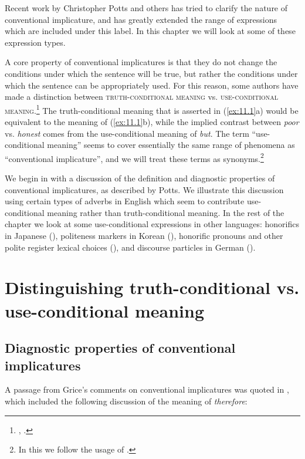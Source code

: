 Recent work by Christopher Potts and others has tried to clarify the nature of conventional implicature, and has greatly extended the range of expressions which are included under this label. In this chapter we will look at some of these expression types.



A core property of conventional implicatures is that they do not change the conditions under which the sentence will be true, but rather the conditions under which the sentence can be appropriately used. For this reason, some authors have made a distinction between \textsc{truth-conditional meaning} vs. \textsc{use-conditional meaning}.\footnote{\citet{Gutzmann2015}, \citet{Recanati2004}.} The truth-conditional meaning that is asserted in (\ref{ex:11.1}a) would be equivalent to the meaning of (\ref{ex:11.1}b), while the implied contrast between \textit{poor} vs. \textit{honest} comes from the use-conditional meaning of \textit{but}. The term “use-conditional meaning” seems to cover essentially the same range of phenomena as “conventional implicature”, and we will treat these terms as synonyms.\footnote{In this we follow the usage of \citet{Gutzmann2015}.}



We begin in  with a discussion of the definition and diagnostic properties of conventional implicatures, as described by Potts. We illustrate this discussion using certain types of adverbs in English which seem to contribute use-conditional meaning rather than truth-conditional meaning. In the rest of the chapter we look at some use-conditional expressions in other languages: honorifics in {Japanese} (), politeness markers in {Korean} (), honorific pronouns and other polite register lexical choices (), and discourse particles in {German} ().


\section{Distinguishing truth-conditional vs. use-conditional meaning}\label{sec:11.2}
\subsection{Diagnostic properties of conventional implicatures}\label{sec:11.2.1}

A passage from Grice’s comments on conventional implicatures was quoted in , which included the following discussion of the meaning of \textit{therefore}:


